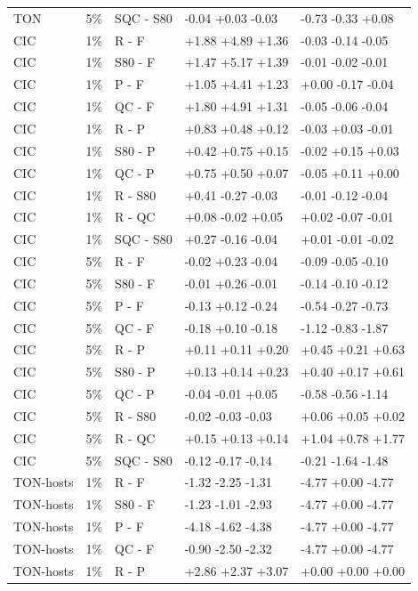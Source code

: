 \documentclass[10pt]{article}
\begin{document}
{\begin{longtable}{lllll}
TON & 5\% & SQC - S80 & -0.04 +0.03 -0.03 & -0.73 -0.33 +0.08 \\
CIC & 1\% & R - F & +1.88 +4.89 +1.36 & -0.03 -0.14 -0.05 \\
CIC & 1\% & S80 - F & +1.47 +5.17 +1.39 & -0.01 -0.02 -0.01 \\
CIC & 1\% & P - F & +1.05 +4.41 +1.23 & +0.00 -0.17 -0.04 \\
CIC & 1\% & QC - F & +1.80 +4.91 +1.31 & -0.05 -0.06 -0.04 \\
CIC & 1\% & R - P & +0.83 +0.48 +0.12 & -0.03 +0.03 -0.01 \\
CIC & 1\% & S80 - P & +0.42 +0.75 +0.15 & -0.02 +0.15 +0.03 \\
CIC & 1\% & QC - P & +0.75 +0.50 +0.07 & -0.05 +0.11 +0.00 \\
CIC & 1\% & R - S80 & +0.41 -0.27 -0.03 & -0.01 -0.12 -0.04 \\
CIC & 1\% & R - QC & +0.08 -0.02 +0.05 & +0.02 -0.07 -0.01 \\
CIC & 1\% & SQC - S80 & +0.27 -0.16 -0.04 & +0.01 -0.01 -0.02 \\
CIC & 5\% & R - F & -0.02 +0.23 -0.04 & -0.09 -0.05 -0.10 \\
CIC & 5\% & S80 - F & -0.01 +0.26 -0.01 & -0.14 -0.10 -0.12 \\
CIC & 5\% & P - F & -0.13 +0.12 -0.24 & -0.54 -0.27 -0.73 \\
CIC & 5\% & QC - F & -0.18 +0.10 -0.18 & -1.12 -0.83 -1.87 \\
CIC & 5\% & R - P & +0.11 +0.11 +0.20 & +0.45 +0.21 +0.63 \\
CIC & 5\% & S80 - P & +0.13 +0.14 +0.23 & +0.40 +0.17 +0.61 \\
CIC & 5\% & QC - P & -0.04 -0.01 +0.05 & -0.58 -0.56 -1.14 \\
CIC & 5\% & R - S80 & -0.02 -0.03 -0.03 & +0.06 +0.05 +0.02 \\
CIC & 5\% & R - QC & +0.15 +0.13 +0.14 & +1.04 +0.78 +1.77 \\
CIC & 5\% & SQC - S80 & -0.12 -0.17 -0.14 & -0.21 -1.64 -1.48 \\
TON-hosts & 1\% & R - F & -1.32 -2.25 -1.31 & -4.77 +0.00 -4.77 \\
TON-hosts & 1\% & S80 - F & -1.23 -1.01 -2.93 & -4.77 +0.00 -4.77 \\
TON-hosts & 1\% & P - F & -4.18 -4.62 -4.38 & -4.77 +0.00 -4.77 \\
TON-hosts & 1\% & QC - F & -0.90 -2.50 -2.32 & -4.77 +0.00 -4.77 \\
TON-hosts & 1\% & R - P & +2.86 +2.37 +3.07 & +0.00 +0.00 +0.00 \\

\end{longtable}}
\end{document}
